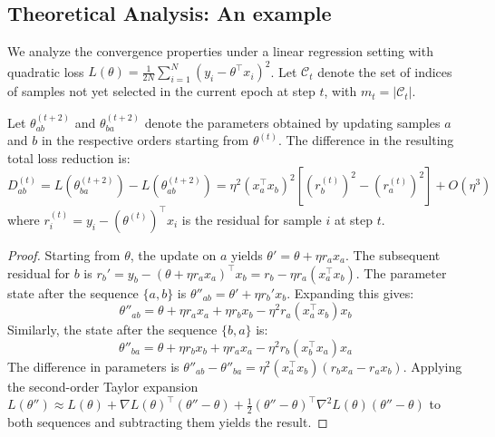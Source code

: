 \subsection{Theoretical Analysis: An example}

We analyze the convergence properties under a linear regression setting with quadratic loss $L(\theta) = \frac{1}{2N} \sum_{i=1}^N (y_i - \theta^\top x_i)^2$. Let $\mathcal{C}_t$ denote the set of indices of samples not yet selected in the current epoch at step $t$, with $m_t = |\mathcal{C}_t|$.
\begin{tcolorbox}[colback=lightpurple, colframe=lightpurple, sharp corners=all, boxrule=0mm, boxsep=0.5mm, left=1.5mm, right=1.5mm, top=1.5mm, bottom=1.5mm]
\begin{lemma}
Let $\theta^{(t+2)}_{ab}$ and $\theta^{(t+2)}_{ba}$ denote the parameters obtained by updating samples $a$ and $b$ in the respective orders starting from $\theta^{(t)}$. The difference in the resulting total loss reduction is:
\begin{equation}
    D_{ab}^{(t)} = L(\theta^{(t+2)}_{ba}) - L(\theta^{(t+2)}_{ab}) = \eta^2 (x_a^\top x_b)^2 \left[(r_b^{(t)})^2 - (r_a^{(t)})^2\right] + O(\eta^3)
\end{equation}
where $r_i^{(t)} = y_i - (\theta^{(t)})^\top x_i$ is the residual for sample $i$ at step $t$.
\end{lemma}
\end{tcolorbox}
\begin{proof}
Starting from $\theta$, the update on $a$ yields $\theta' = \theta + \eta r_a x_a$. The subsequent residual for $b$ is $r_b' = y_b - (\theta + \eta r_a x_a)^\top x_b = r_b - \eta r_a (x_a^\top x_b)$. The parameter state after the sequence $\{a, b\}$ is $\theta''_{ab} = \theta' + \eta r_b' x_b$. Expanding this gives:
\begin{equation}
    \theta''_{ab} = \theta + \eta r_a x_a + \eta r_b x_b - \eta^2 r_a (x_a^\top x_b) x_b
\end{equation}
Similarly, the state after the sequence $\{b, a\}$ is:
\begin{equation}
    \theta''_{ba} = \theta + \eta r_b x_b + \eta r_a x_a - \eta^2 r_b (x_b^\top x_a) x_a
\end{equation}
The difference in parameters is $\theta''_{ab} - \theta''_{ba} = \eta^2 (x_a^\top x_b) (r_b x_a - r_a x_b)$. Applying the second-order Taylor expansion $L(\theta'') \approx L(\theta) + \nabla L(\theta)^\top (\theta'' - \theta) + \frac{1}{2} (\theta'' - \theta)^\top \nabla^2 L(\theta) (\theta'' - \theta)$ to both sequences and subtracting them yields the result.
\end{proof}
